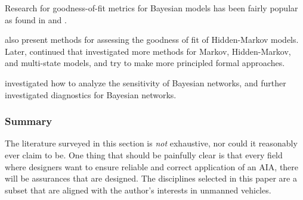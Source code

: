     Research for goodness-of-fit metrics for Bayesian models has been fairly popular as found in \citet{Dannemann2008-ch,Johnson2004-mv,Yuan2012-tb} and \citet{Spiegelhalter2002-ia}.

    \cite{MacKay_Altman2004-fl} also present methods for assessing the goodness of fit of Hidden-Markov models. Later, \citet{Titman2008-ct,Titman2012-zw,Titman2010-qx} continued that investigated more methods for Markov, Hidden-Markov, and multi-state models, and try to make more principled formal approaches.

    
    \citet{Laskey1995-jp} investigated how to analyze the sensitivity of Bayesian networks, and \citet{Sinharay2006-yc} further investigated diagnostics for Bayesian networks.

\subsubsection{Summary}
    The literature surveyed in this section is \emph{not} exhaustive, nor could it reasonably ever claim to be. One thing that should be painfully clear is that every field where designers want to ensure reliable and correct application of an AIA, there will be assurances that are designed. The disciplines selected in this paper are a subset that are aligned with the author's interests in unmanned vehicles. 

%


